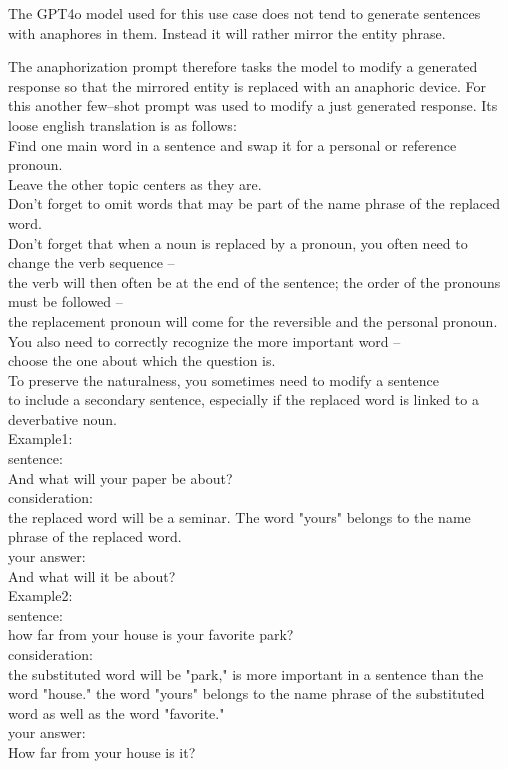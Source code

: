\documentclass[12pt]{report}
\begin{document}
{The GPT4o model used for this use case
does not tend to generate sentences with anaphores in them.
Instead it will rather mirror the entity phrase.

The anaphorization prompt therefore tasks the model
to modify a generated response so
that the mirrored entity is replaced with
an anaphoric device.
For this another few–shot prompt was used to modify a just generated response.
Its loose english translation is as follows:\\

\linespread{1.5}
{\tiny
Find one main word in a sentence and swap it for a personal or reference pronoun.\\
 Leave the other topic centers as they are.\\
 Don't forget to omit words that may be part of the name phrase of the replaced word.\\
 Don't forget that when a noun is replaced by a pronoun, you often need to change the verb sequence –\\
 the verb will then often be at the end of the sentence; the order of the pronouns must be followed –\\
 the replacement pronoun will come for the reversible and the personal pronoun. You also need to correctly recognize the more important word –\\
 choose the one about which the question is.\\
 To preserve the naturalness, you sometimes need to modify a sentence\\
 to include a secondary sentence, especially if the replaced word is linked to a deverbative noun.\\

 Example1:\\
 sentence:\\
 And what will your paper be about?\\
 consideration:\\
 the replaced word will be a seminar. The word "yours" belongs to the name phrase of the replaced word.\\
 your answer:\\
 And what will it be about?\\

 Example2:\\
 sentence:\\
 how far from your house is your favorite park?\\
 consideration:\\
 the substituted word will be "park," is more important in a sentence than the word "house." the word "yours" belongs to the name phrase of the substituted word as well as the word "favorite."\\
 your answer:\\
 How far from your house is it?\\

}}
\end{document}
